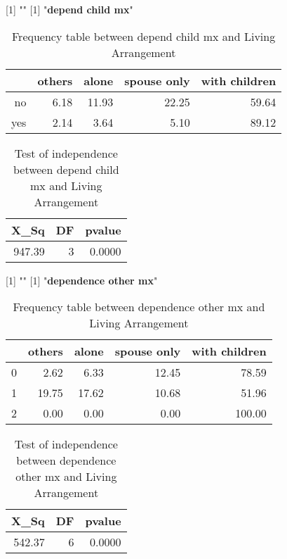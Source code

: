 \documentclass[11pt]{article}
\begin{document}
[1] "\newline"
[1] "{\bf{depend child mx}}"
\begin{table}[H]
\centering
\begin{tabular}{rrrrr}
  \hline
 & others & alone & spouse only & with children \\ 
  \hline
no & 6.18 & 11.93 & 22.25 & 59.64 \\ 
  yes & 2.14 & 3.64 & 5.10 & 89.12 \\ 
   \hline
\end{tabular}
\caption{Frequency table between depend child mx and Living Arrangement} 
\end{table}
\begin{table}[H]
\centering
\begin{tabular}{rrr}
  \hline
X\_Sq & DF & pvalue \\ 
  \hline
947.39 & 3 & 0.0000 \\ 
   \hline
\end{tabular}
\caption{Test of independence between depend child mx and Living Arrangement} 
\end{table}
[1] "\newline"
[1] "{\bf{dependence other mx}}"
\begin{table}[H]
\centering
\begin{tabular}{rrrrr}
  \hline
 & others & alone & spouse only & with children \\ 
  \hline
0 & 2.62 & 6.33 & 12.45 & 78.59 \\ 
  1 & 19.75 & 17.62 & 10.68 & 51.96 \\ 
  2 & 0.00 & 0.00 & 0.00 & 100.00 \\ 
   \hline
\end{tabular}
\caption{Frequency table between dependence other mx and Living Arrangement} 
\end{table}
\begin{table}[H]
\centering
\begin{tabular}{rrr}
  \hline
X\_Sq & DF & pvalue \\ 
  \hline
542.37 & 6 & 0.0000 \\ 
   \hline
\end{tabular}
\caption{Test of independence between dependence other mx and Living Arrangement} 
\end{table}
\end{document}
